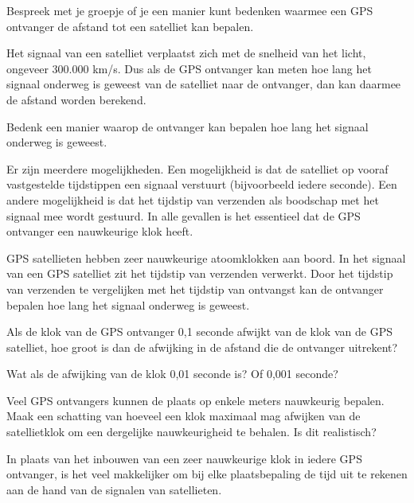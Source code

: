 \begin{opgave}[\discussie]
	Bespreek met je groepje of je een manier kunt bedenken waarmee een GPS ontvanger de afstand tot een satelliet kan bepalen.
\end{opgave}

Het signaal van een satelliet verplaatst zich met de snelheid van het licht, ongeveer 300.000 km/s. Dus als de GPS ontvanger kan meten hoe lang het signaal onderweg is geweest van de satelliet naar de ontvanger, dan kan daarmee de afstand worden berekend.

\begin{opgave}
	Bedenk een manier waarop de ontvanger kan bepalen hoe lang het signaal onderweg is geweest.
	\begin{antwoord}
		Er zijn meerdere mogelijkheden. Een mogelijkheid is dat de satelliet op vooraf vastgestelde tijdstippen een signaal verstuurt (bijvoorbeeld iedere seconde). Een andere mogelijkheid is dat het tijdstip van verzenden als boodschap met het signaal mee wordt gestuurd. In alle gevallen is het essentieel dat de GPS ontvanger een nauwkeurige klok heeft.
	\end{antwoord}
\end{opgave}

GPS satellieten hebben zeer nauwkeurige atoomklokken aan boord. In het signaal van een GPS satelliet zit het tijdstip van verzenden verwerkt. Door het tijdstip van verzenden te vergelijken met het tijdstip van ontvangst kan de ontvanger bepalen hoe lang het signaal onderweg is geweest.

\begin{opgave}
	\begin{subopgave}
		Als de klok van de GPS ontvanger 0,1 seconde afwijkt van de klok van de GPS satelliet, hoe groot is dan de afwijking in de afstand die de ontvanger uitrekent?
	\end{subopgave}
	\begin{subopgave}
		Wat als de afwijking van de klok 0,01 seconde is? Of 0,001 seconde?
	\end{subopgave}
	\begin{subopgave}
		Veel GPS ontvangers kunnen de plaats op enkele meters nauwkeurig bepalen. Maak een schatting van hoeveel een klok maximaal mag afwijken van de satellietklok om een dergelijke nauwkeurigheid te behalen. Is dit realistisch?
	\end{subopgave}
\end{opgave}

In plaats van het inbouwen van een zeer nauwkeurige klok in iedere GPS ontvanger, is het veel makkelijker om bij elke plaatsbepaling de tijd uit te rekenen aan de hand van de signalen van satellieten.

